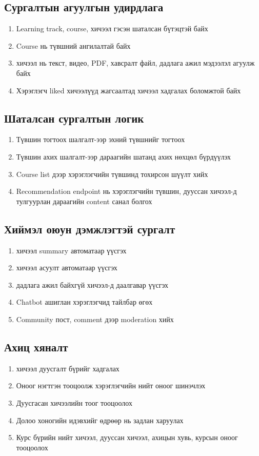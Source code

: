 \subsection{Сургалтын агуулгын удирдлага}
\begin{enumerate}
\item Learning track, course, хичээл гэсэн шаталсан бүтэцтэй байх
\item Course нь түвшний ангилалтай байх
\item хичээл нь текст, видео, PDF, хавсралт файл, дадлага ажил мэдээлэл агуулж байх
\item Хэрэглэгч liked хичээлүүд жагсаалтад хичээл хадгалах боломжтой байх
\end{enumerate}

\subsection{Шаталсан сургалтын логик}
\begin{enumerate}
\item Түвшин тогтоох шалгалт-ээр эхний түвшнийг тогтоох
\item Түвшин ахих шалгалт-ээр дараагийн шатанд ахих нөхцөл бүрдүүлэх
\item Course list дээр хэрэглэгчийн түвшинд тохирсон шүүлт хийх
\item Recommendation endpoint нь хэрэглэгчийн түвшин, дууссан хичээл-д тулгуурлан дараагийн content санал болгох
\end{enumerate}

\subsection{Хиймэл оюун дэмжлэгтэй сургалт}
\begin{enumerate}
\item хичээл summary автоматаар үүсгэх
\item хичээл асуулт автоматаар үүсгэх
\item дадлага ажил байхгүй хичээл-д даалгавар үүсгэх
\item Chatbot ашиглан хэрэглэгчид тайлбар өгөх
\item Community пост, comment дээр moderation хийх
\end{enumerate}

\subsection{Ахиц хяналт}
\begin{enumerate}
\item хичээл дуусгалт бүрийг хадгалах
\item Оноог нэгтгэн тооцоолж хэрэглэгчийн нийт оноог шинэчлэх
\item Дуусгасан хичээлийн тоог тооцоолох
\item Долоо хоногийн идэвхийг өдрөөр нь задлан харуулах
\item Курс бүрийн нийт хичээл, дууссан хичээл, ахицын хувь, курсын оноог тооцоолох
\end{enumerate}

